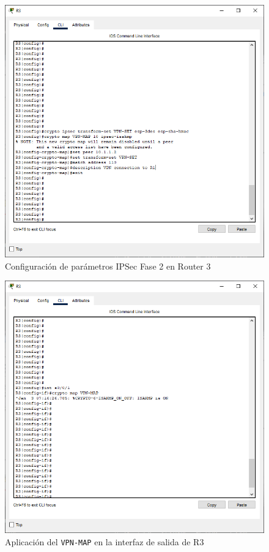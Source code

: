 \documentclass{article}
\begin{document}
        \begin{figure}[!h]
            \centering
            \includegraphics[scale=0.45]{img/task2-step3.png}
            \caption{Configuración de parámetros IPSec Fase 2 en Router 3}
            \label{fig:task2-step3}
        \end{figure}

        \clearpage
        \begin{figure}[!h]
            \centering
            \includegraphics[scale=0.45]{img/task2-step4.png}
            \caption{Aplicación del \texttt{VPN-MAP} en la interfaz de salida de R3}
            \label{fig:task2-step4}
        \end{figure}
\end{document}
